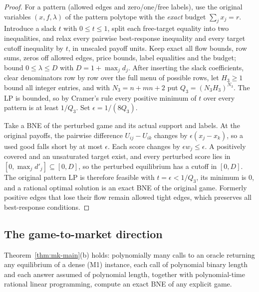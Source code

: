 \begin{proof}
For a pattern (allowed edges and zero/one/free labels), use the original variables $(x,f,\lambda)$ of
the pattern polytope with the \emph{exact} budget $\sum_jx_j=r$. Introduce a slack $t$ with
$0\le t\le1$, split each free-target equality into two inequalities, and relax every pairwise
best-response inequality and every target cutoff inequality by $t$, in unscaled payoff units. Keep
exact all flow bounds, row sums, zeros off allowed edges, price bounds, label equalities and the
budget; bound $0\le\lambda\le D$ with $D=1+\max_jd_j$. After inserting the slack coefficients, clear
denominators row by row over the full menu of possible rows, let $H_3\ge1$ bound all integer entries,
and with $N_3=n+mn+2$ put $Q_3=(N_3H_3)^{N_3}$. The LP is bounded, so by Cramer's rule every positive
minimum of $t$ over every pattern is at least $1/Q_3$. Set $\epsilon=1/(8Q_3)$.

Take a BNE of the perturbed game and its actual support and labels. At the original payoffs, the
pairwise difference $U_{ij}-U_{ik}$ changes by $\epsilon(x_j-x_k)$, so a used good falls short by at
most $\epsilon$. Each score changes by $\epsilon w_j\le\epsilon$. A positively covered and an
unsaturated target exist, and every perturbed score lies in $[0,\max_jd'_j]\subseteq[0,D]$, so the
perturbed equilibrium has a cutoff in $[0,D]$. The original pattern LP is therefore feasible with
$t=\epsilon<1/Q_3$, its minimum is $0$, and a rational optimal solution is an exact BNE of the original
game. Formerly positive edges that lose their flow remain allowed tight edges, which preserves all
best-response conditions.
\end{proof}

\subsection{The game-to-market direction}

\begin{proposition}\label{prop:mk-g2m}
\statusrefereed
Theorem~\ref{thm:mk-main}(b) holds: polynomially many calls to an oracle returning any equilibrium of
a dense (M1) instance, each call of polynomial binary length and each answer assumed of polynomial
length, together with polynomial-time rational linear programming, compute an exact BNE of any explicit
game.
\end{proposition}

